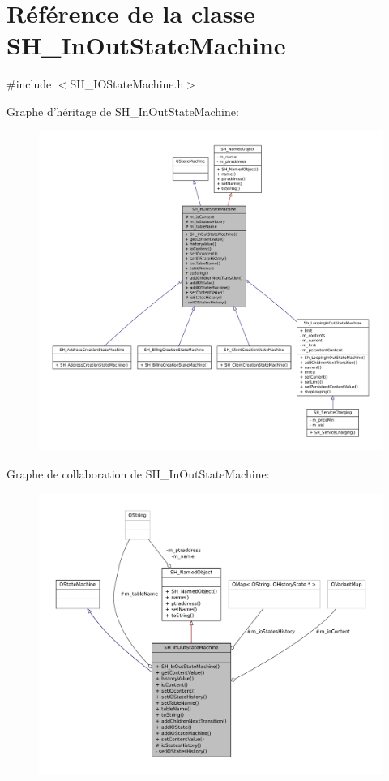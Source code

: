 \hypertarget{classSH__InOutStateMachine}{\section{Référence de la classe S\-H\-\_\-\-In\-Out\-State\-Machine}
\label{classSH__InOutStateMachine}
}


{\ttfamily \#include $<$S\-H\-\_\-\-I\-O\-State\-Machine.\-h$>$}



Graphe d'héritage de S\-H\-\_\-\-In\-Out\-State\-Machine\-:\nopagebreak
\begin{figure}[H]
\begin{center}
\leavevmode
\includegraphics[width=350pt]{classSH__InOutStateMachine__inherit__graph}
\end{center}
\end{figure}


Graphe de collaboration de S\-H\-\_\-\-In\-Out\-State\-Machine\-:\nopagebreak
\begin{figure}[H]
\begin{center}
\leavevmode
\includegraphics[width=350pt]{classSH__InOutStateMachine__coll__graph}
\end{center}
\end{figure}
